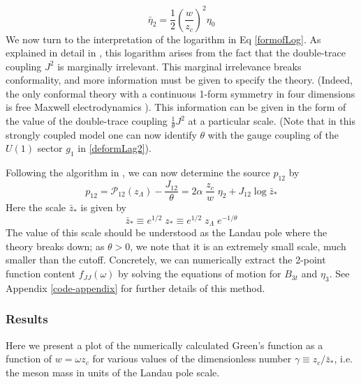 \documentclass[aps,preprint,nofootinbib,preprintnumbers,eqsecnum,superscriptaddress]{revtex4}
\def\th{{\theta}}
\begin{document}
\begin{equation}
	\bar{\eta}_2 = \frac{1}{2} \left(\frac{w}{z_c}\right)^2 \eta_0
\end{equation}
We now turn to the interpretation of the logarithm in Eq \eqref{formofLog}. As explained in detail in \cite{Hofman:2017vwr}, this logarithm arises from the fact that the double-trace coupling $J^2$ is marginally irrelevant. This marginal irrelevance breaks conformality, and more information must be given to specify the theory. (Indeed, the only conformal theory with a continuous 1-form symmetry in four dimensions is free Maxwell electrodynamics \cite{Hofman:2018lfz,Cordova:2018cvg}). This information can be given in the form of the value of the double-trace coupling $\frac{1}{\theta} J^2$ at a particular scale. (Note that in this strongly coupled model one can now identify $\theta$ with the gauge coupling of the $U(1)$ sector $g_1$ in \eqref{deformLag2}). 

Following the algorithm in \cite{Hofman:2017vwr}, we can now determine the source $p_{12}$ by
\begin{equation}
	p_{12}= \mathcal{P}_{12}(z_\Lambda) - \frac{J_{12}}{\theta} = 2\alpha \; \frac{z_c}{w} \; \eta_2 + J_{12} \log \bar{z}_*
\end{equation}
Here the scale $\bar{z}_*$ is given by
\begin{equation}
	\bar{z}_* \equiv e^{1/2} \; z_* \equiv e^{1/2} \; z_\Lambda \; e^{-1/\theta}
\end{equation}
The value of this scale should be understood as the Landau pole where the theory breaks down; as $\th > 0$, we note that it is an extremely small scale, much smaller than the cutoff. 
Concretely, we can numerically extract the 2-point function content $f_{JJ}(\omega)$ by solving the equations of motion for $B_{3t}$ and $\eta_{3}$. See Appendix \ref{code-appendix} for further details of this method.

\subsubsection{Results}
Here we present a plot of the numerically calculated Green's function as a function of $w = \omega z_c$ for various values of the dimensionless number $\gamma \equiv z_c/\bar{z}_*$, i.e. the meson mass in units of the Landau pole scale. 
\end{document}
